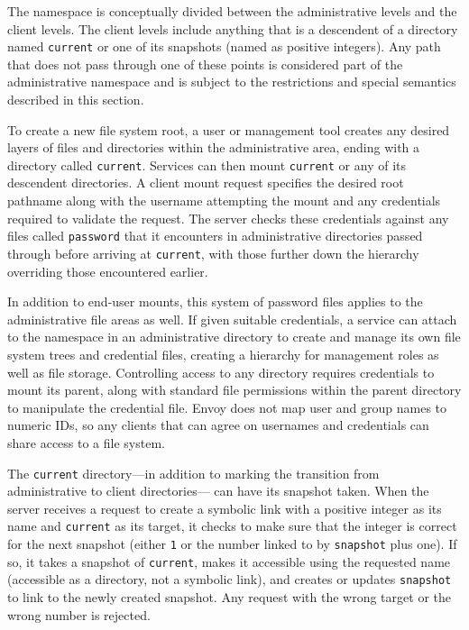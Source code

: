 The namespace is conceptually divided between the administrative levels and the client levels. The client levels include anything that is a descendent of a directory named \texttt{current} or one of its snapshots (named as positive integers). Any path that does not pass through one of these points is considered part of the administrative namespace and is subject to the restrictions and special semantics described in this section.

To create a new file system root, a user or management tool creates any desired layers of files and directories within the administrative area, ending with a directory called \texttt{current}. Services can then mount \texttt{current} or any of its descendent directories. A client mount request specifies the desired root pathname along with the username attempting the mount and any credentials required to validate the request. The server checks these credentials against any files called \texttt{password} that it encounters in administrative directories passed through before arriving at \texttt{current}, with those further down the hierarchy overriding those encountered earlier.

In addition to end-user mounts, this system of password files applies to the administrative file areas as well. If given suitable credentials, a service can attach to the namespace in an administrative directory to create and manage its own file system trees and credential files, creating a hierarchy for management roles as well as file storage. Controlling access to any directory requires credentials to mount its parent, along with standard file permissions within the parent directory to manipulate the credential file. Envoy does not map user and group names to numeric IDs, so any clients that can agree on usernames and credentials can share access to a file system.

The \texttt{current} directory---in addition to marking the transition from administrative to client directories--- can have its snapshot taken. When the server receives a request to create a symbolic link with a positive integer as its name and \texttt{current} as its target, it checks to make sure that the integer is correct for the next snapshot (either \texttt{1} or the number linked to by \texttt{snapshot} plus one). If so, it takes a snapshot of \texttt{current}, makes it accessible using the requested name (accessible as a directory, not a symbolic link), and creates or updates \texttt{snapshot} to link to the newly created snapshot. Any request with the wrong target or the wrong number is rejected.

